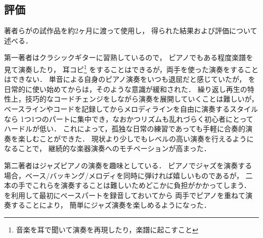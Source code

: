 \subsection{評価}

著者らが{\system}の試作品を約2ヶ月に渡って使用し，
得られた結果および評価について述べる．

第一著者はクラシックギターに習熟しているので，
ピアノでもある程度楽譜を見て演奏したり，
耳コピ\footnote{\textsf{音楽を耳で聞いて演奏を再現したり，楽譜に起こすこと}}
をすることはできるが，両手を使った演奏をすることはできない．
単音による自身のピアノ演奏をいつも退屈だと感じていたが，
{\system}を日常的に使い始めてからは，そのような意識が緩和された．
繰り返し再生の特性上，技巧的なコードチェンジをしながら演奏を展開していくことは難しいが，
ベースラインやコードを記録してからメロディラインを自由に演奏するスタイルなら
1つ1つのパートに集中でき，なおかつリズムも乱れづらく初心者にとってハードルが低い．
これによって，孤独な日常の練習であっても手軽に合奏的演奏を楽しむことができた．
現状より少しでもレベルの高い演奏を行えるようになることで，
継続的な楽器演奏へのモチベーションが高まった．

第二著者はジャズピアノの演奏を趣味としている．
ピアノでジャズを演奏する場合，ベース/バッキング/メロディを同時に弾ければ嬉しいものであるが，
二本の手でこれらを演奏することは難しいためどこかに負担がかかってしまう．
{\system}を利用して最初にベースパートを録音しておいてから
両手でピアノを重ねて演奏することにより，
簡単にジャズ演奏を楽しめるようになった．
